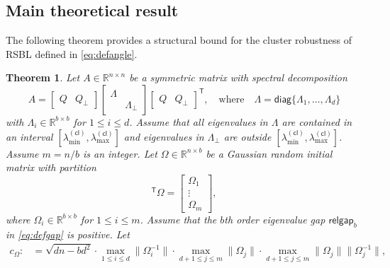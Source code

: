 \documentclass{article}
\newtheorem{theorem}{Theorem}
\newcommand{\Ttran}{\mathsf{T}}
\newcommand{\cl}{(\mathsf{cl})}
\newcommand{\R}{\mathbb{R}}
\newcommand{\gap}{\mathsf{relgap}}
\providecommand{\diagm}{\mathsf{diag}}
\providecommand{\norm}[1]{\lVert#1\rVert}
\begin{document}
\subsection{Main theoretical result}
The following theorem provides a structural bound for the cluster robustness of RSBL defined in \cref{eq:defangle}.
\begin{theorem}
    \label{thm:sb}
    Let $A\in\R^{n\times n}$ be a symmetric matrix with spectral decomposition
    \begin{equation}
        \label{eq:decompA}
        A = \begin{bmatrix}
            Q & Q_{\perp}
        \end{bmatrix} 
        \begin{bmatrix}
            \Lambda&\\ 
            &\Lambda_{\perp}
        \end{bmatrix}
        \begin{bmatrix}
            Q & Q_{\perp}
        \end{bmatrix}^{\Ttran},
        \quad \text{where}\quad \Lambda = \diagm\{ \Lambda_{1},\dotsc,\Lambda_{d} \}
    \end{equation}
    with $\Lambda_{i}\in\R^{b\times b}$ for $1\leq i\leq d$.
    Assume that all eigenvalues in $\Lambda$ are contained in an interval $[\lambda_{\min}^{\cl},\lambda_{\max}^{\cl}]$ and eigenvalues in $\Lambda_{\perp}$ are outside $[\lambda_{\min}^{\cl},\lambda_{\max}^{\cl}]$. 
    Assume $m=n/b$ is an integer.
    Let $\Omega\in\R^{n\times b}$ be a Gaussian random initial matrix with partition 
    \begin{equation*}
        [
            Q, Q_{\perp}
        ]^{\Ttran}\Omega
        = 
        \begin{bmatrix}
            \Omega_{1}\\ \vdots \\ \Omega_{m}
        \end{bmatrix},
    \end{equation*}
    where $\Omega_{i}\in\R^{b\times b}$ for $1\leq i\leq m$. Assume that the $b$th order eigenvalue gap $\gap_{b}$ in \cref{eq:defgap} is positive. Let  
\begin{equation*}
    \begin{aligned}
        c_{\Omega} :&=  \sqrt{dn-bd^{2}}\cdot \max\limits_{1\leq i\leq d}\norm{\Omega_{i}^{-1}}\cdot\max_{d+1\leq j\leq m}\norm{\Omega_{j}}
        \cdot \max\limits_{d+1\leq j\leq m}\norm{\Omega_{j}}\norm{\Omega_{j}^{-1}}, \\  

\end{aligned}
\end{equation*}
\end{theorem}
\end{document}
